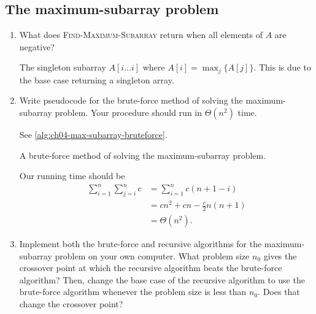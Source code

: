 \documentclass[Chapter04]{subfiles}
\begin{document}
	\subsection{The maximum-subarray problem}

	\begin{enumerate}
		\item What does \textsc{Find-Maximum-Subarray} return when all elements of $A$ are negative?
		\begin{answer}
			The singleton subarray $A[i \dots i]$ where $A[i] = \max_{j}\{A[j]\}$. This is due to the base case returning a singleton array.
		\end{answer}

		\item Write pseudocode for the brute-force method of solving the maximum-subarray problem. Your procedure should run in $\Theta(n^2)$ time.
		\begin{answer}
			See \cref{alg:ch04-max-subarray-bruteforce}.

			\begin{algorithm}[H]
				\caption{A brute-force method of solving the maximum-subarray problem.}
				\label{alg:ch04-max-subarray-bruteforce}

			\end{algorithm}
			Our running time should be
			\begin{align*}
				\sum_{i = 1}^n \sum_{j = i}^n c &= \sum_{i = 1}^n c(n + 1 - i)\\
					&= cn^2 + cn - \frac{c}{2}n(n+1)\\
					&= \Theta(n^2).
			\end{align*}
		\end{answer}

		\item Implement both the brute-force and recursive algorithms for the maximum-subarray problem on your own computer. What problem size $n_0$ gives the crossover point at which the recursive algorithm beats the brute-force algorithm? Then, change the base case of the recursive algorithm to use the brute-force algorithm whenever the problem size is less than $n_0$. Does that change the crossover point?
		\begin{answer}
			

\end{answer}
\end{enumerate}
\end{document}
